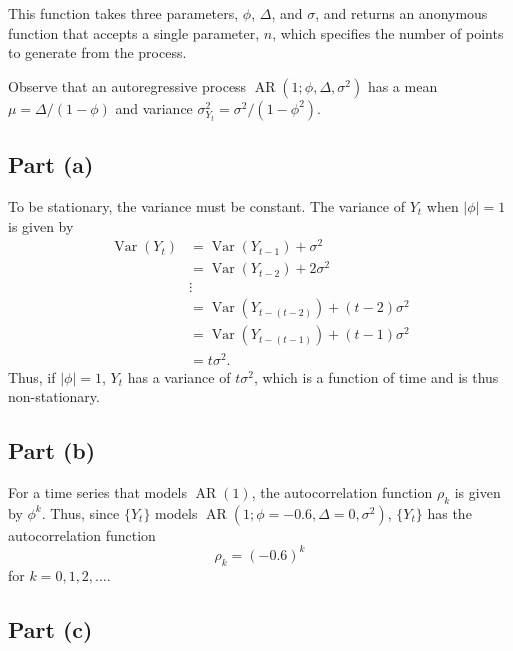 \documentclass[
]{article}
\begin{document}
This function takes three parameters, \(\phi\), \(\Delta\), and
\(\sigma\), and returns an anonymous function that accepts a single
parameter, \(n\), which specifies the number of points to generate from
the process.

Observe that an autoregressive process
\(\operatorname{AR}(1; \phi, \Delta, \sigma^2)\) has a mean
\(\mu = \Delta / (1-\phi)\) and variance
\(\sigma_{Y_t}^2 = \sigma^2 / (1-\phi^2)\).

\hypertarget{part-a-1}{%
\subsection{Part (a)}\label{part-a-1}}


To be stationary, the variance must be constant. The variance of \(Y_t\)
when \(|\phi|=1\) is given by \begin{align*}
   \operatorname{Var}(Y_t)
      &= \operatorname{Var}(Y_{t−1}) + \sigma^2\\
      &= \operatorname{Var}(Y_{t−2}) + 2 \sigma^2\\
      &\vdots\\
      &= \operatorname{Var}(Y_{t-(t-2)}) + (t-2) \sigma^2\\
      &= \operatorname{Var}(Y_{t-(t-1)}) + (t-1) \sigma^2\\
      &= t \sigma^2.
\end{align*} Thus, if \(|\phi|=1\), \(Y_t\) has a variance of
\(t \sigma^2\), which is a function of time and is thus non-stationary.

\hypertarget{part-b-1}{%
\subsection{Part (b)}\label{part-b-1}}


For a time series that models \(\operatorname{AR}(1)\), the
autocorrelation function \(\rho_k\) is given by \(\phi^k\). Thus, since
\(\{Y_t\}\) models
\(\operatorname{AR}(1 ; \phi=-0.6, \Delta = 0, \sigma^2)\), \(\{Y_t\}\)
has the autocorrelation function \[
   \rho_k = (-0.6)^k
\] for \(k = 0,1,2,\ldots\).

\hypertarget{part-c-1}{%
\subsection{Part (c)}\label{part-c-1}}
\end{document}
